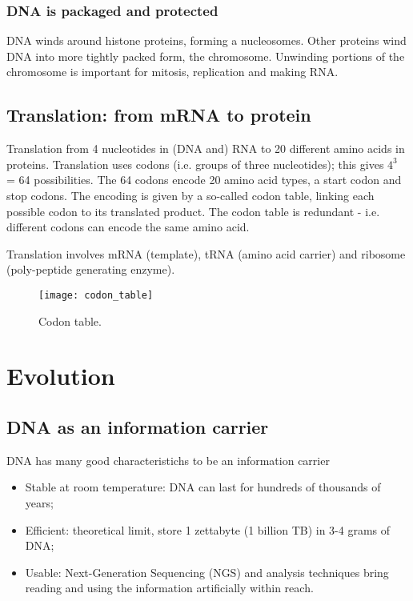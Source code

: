 \subsubsection{DNA is packaged and protected}

DNA winds around histone proteins, forming a nucleosomes. Other proteins wind DNA
into more tightly packed form, the chromosome. Unwinding portions of the 
chromosome is important for mitosis, replication and making RNA.

\subsection{Translation: from mRNA to protein}

Translation from 4 nucleotides in (DNA and) RNA to 20 different amino acids in 
proteins. Translation uses codons (i.e. groups of three nucleotides); this gives 
$4^3$ = 64 possibilities. The 64 codons encode 20 amino acid types, a start codon
and stop codons. The encoding is given by a so-called codon table, linking each 
possible codon to its translated product. The codon table is redundant - i.e. 
different codons can encode the same amino acid. 

Translation involves mRNA (template), tRNA (amino acid carrier) and ribosome 
(poly-peptide generating enzyme).

\begin{figure}
\centering
\texttt{[image: codon\_table]}
\caption{Codon table.}
\label{Codon table}
\end{figure}

\section{Evolution}

\subsection{DNA as an information carrier}

DNA has many good characteristichs to be an information carrier

\begin{itemize}
\item Stable at room temperature: DNA can last for hundreds of thousands of 
years;
\item Efficient: theoretical limit, store 1 zettabyte (1 billion TB) in 3-4
grams of DNA;
\item Usable: Next-Generation Sequencing (NGS) and analysis techniques bring 
reading and using the information artificially within reach.
\end{itemize}

